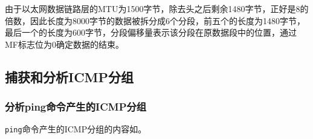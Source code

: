 \documentclass[lang=cn,11pt,a4paper,cite=authornum]{paper}
\begin{document}
由于以太网数据链路层的MTU为1500字节，除去头之后剩余1480字节，正好是8的倍数，因此长度为8000字节的数据被拆分成6个分段，前五个的长度为1480字节，最后一个的长度为600字节，分段偏移量表示该分段在原数据段中的位置，通过MF标志位为0确定数据的结束。

\subsection{捕获和分析ICMP分组}

\subsubsection{分析ping命令产生的ICMP分组}

\texttt{ping}命令产生的ICMP分组的内容如。
\end{document}
